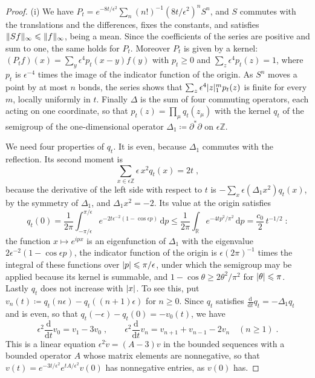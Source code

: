 \documentclass[11pt]{preprint}
\newcommand{\dd}{\mathrm{d}}
\DeclarePairedDelimiter{\abs}{\lvert}{\rvert}
\DeclarePairedDelimiter{\norm}{\lVert}{\rVert}
\numberwithin{equation}{section}
\begin{document}
\begin{proof}
(i) We have $P_t = e^{-8t/\epsilon^2}\sum_n(n!)^{-1}(8t/\epsilon^2)^nS^n$, and $S$ commutes with the translations and the differences, fixes the constants, and satisfies $\norm{Sf}_\infty \leqslant \norm f_\infty$, being a mean. Since the coefficients of the series are positive and sum to one, the same holds for $P_t$. Moreover $P_t$ is given by a kernel: $(P_tf)(x) = \sum_y\epsilon^4p_t(x - y)f(y)$ with $p_t \geqslant 0$ and $\sum_z\epsilon^4p_t(z) = 1$, where $p_t$ is $\epsilon^{-4}$ times the image of the indicator function of the origin. As $S^n$ moves a point by at most $n$ bonds, the series shows that $\sum_z\epsilon^4\abs z_1^mp_t(z)$ is finite for every $m$, locally uniformly in $t$. Finally $\Delta$ is the sum of four commuting operators, each acting on one coordinate, so that $p_t(z) = \prod_\mu q_t(z_\mu)$ with the kernel $q_t$ of the semigroup of the one-dimensional operator $\Delta_1 \coloneqq \partial^*\partial$ on $\epsilon\mathbb Z$.

We need four properties of $q_t$. It is even, because $\Delta_1$ commutes with the reflection. Its second moment is
\begin{equation}\label{eq:heat-variance}
    \sum_{x \in \epsilon\mathbb Z}\epsilon\,x^2q_t(x) = 2t\;,
\end{equation}
because the derivative of the left side with respect to $t$ is $-\sum_x\epsilon(\Delta_1x^2)q_t(x)$, by the symmetry of $\Delta_1$, and $\Delta_1x^2 = -2$. Its value at the origin satisfies
\begin{equation}\label{eq:heat-origin}
    q_t(0) = \frac{1}{2\pi}\int_{-\pi/\epsilon}^{\pi/\epsilon}e^{-2t\epsilon^{-2}(1 - \cos\epsilon p)}\,\dd p \leqslant \frac{1}{2\pi}\int_{\mathbb R}e^{-4tp^2/\pi^2}\,\dd p = \frac{c_0}{2}\,t^{-1/2}\;:
\end{equation}
the function $x \mapsto e^{ipx}$ is an eigenfunction of $\Delta_1$ with the eigenvalue $2\epsilon^{-2}(1 - \cos\epsilon p)$, the indicator function of the origin is $\epsilon(2\pi)^{-1}$ times the integral of these functions over $\abs p \leqslant \pi/\epsilon$, under which the semigroup may be applied because its kernel is summable, and $1 - \cos\theta \geqslant 2\theta^2/\pi^2$ for $\abs\theta \leqslant \pi$. Lastly $q_t$ does not increase with $\abs x$. To see this, put $v_n(t) \coloneqq q_t(n\epsilon) - q_t((n + 1)\epsilon)$ for $n \geqslant 0$. Since $q_t$ satisfies $\frac{\dd}{\dd t}q_t = -\Delta_1q_t$ and is even, so that $q_t(-\epsilon) - q_t(0) = -v_0(t)$, we have
\[
    \epsilon^2\frac{\dd}{\dd t}v_0 = v_1 - 3v_0\;,
    \qquad
    \epsilon^2\frac{\dd}{\dd t}v_n = v_{n+1} + v_{n-1} - 2v_n \quad (n \geqslant 1)\;.
\]
This is a linear equation $\epsilon^2\dot v = (A - 3)v$ in the bounded sequences with a bounded operator $A$ whose matrix elements are nonnegative, so that $v(t) = e^{-3t/\epsilon^2}e^{tA/\epsilon^2}v(0)$ has nonnegative entries, as $v(0)$ has.


\end{proof}
\end{document}
